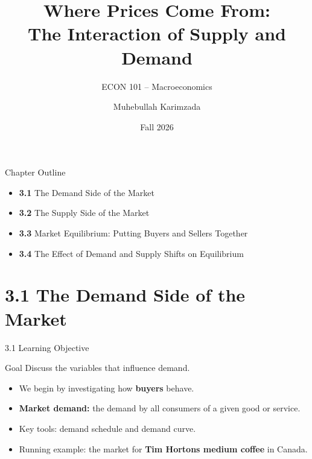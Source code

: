 \documentclass[aspectratio=169]{beamer}
\title{\textbf{Where Prices Come From:\\The Interaction of Supply and Demand}}
\subtitle{{\large ECON 101 -- Macroeconomics}}
\author{Muhebullah Karimzada}
\date{Fall 2026}
\begin{document}

\begin{frame}[plain]
  \titlepage
\end{frame}

\begin{frame}{Chapter Outline}
\transfade
\begin{itemize}[<+->]
  \item \textbf{3.1} The Demand Side of the Market
  \item \textbf{3.2} The Supply Side of the Market
  \item \textbf{3.3} Market Equilibrium: Putting Buyers and Sellers Together
  \item \textbf{3.4} The Effect of Demand and Supply Shifts on Equilibrium
\end{itemize}
\end{frame}

\section{3.1 The Demand Side of the Market}

\begin{frame}{3.1 Learning Objective}
\transfade
\begin{block}{Goal}
Discuss the variables that influence demand.
\end{block}
\begin{itemize}[<+->]
  \item We begin by investigating how \textbf{buyers} behave.
  \item \textbf{Market demand:} the demand by all consumers of a given good or service.
  \item Key tools: demand schedule and demand curve.
  \item Running example: the market for \textbf{Tim Hortons medium coffee} in Canada.
\end{itemize}
\end{frame}
\end{document}
